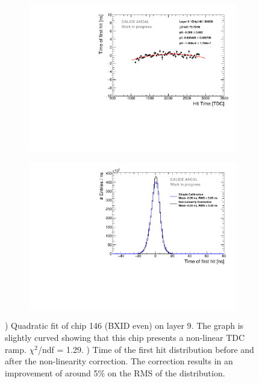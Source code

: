 \documentclass{JINST}
\begin{document}
\begin{figure}[htbp!]
	\begin{subfigure}[t]{0.49\textwidth}
		\centering
		\includegraphics[width=1\linewidth]{fig/LinearityCorrection_Module09_Chip146_BXID0.pdf}
		\caption{} \label{fig:NLCorr}
	\end{subfigure}
	\hfill
	\begin{subfigure}[t]{0.49\textwidth}
		\centering
		\includegraphics[width=1\linewidth]{fig/Timing_AHCAL_LinCorrection.pdf}
		\caption{} \label{fig:TimingNLCorr}
	\end{subfigure}
	\caption{) Quadratic fit of chip 146 (BXID even) on layer 9. The graph is slightly curved showing that this chip presents a non-linear TDC ramp. $\chi^{2}$/ndf = 1.29. ) Time of the first hit distribution before and after the non-linearity correction. The correction results in an improvement of around 5\% on the RMS of the distribution.}
\end{figure}
\end{document}
